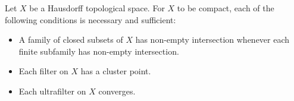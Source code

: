 Let $X$ be a Hausdorff topological space. For $X$ to be compact, each of the following conditions is necessary and sufficient:

\begin{itemize}
\item[(a)] A family of closed subsets of $X$ has non-empty intersection whenever each finite subfamily has non-empty intersection.
\item[(b)] Each filter on $X$ has a cluster point.
\item[(c)] Each ultrafilter on $X$ converges.
\end{itemize}
